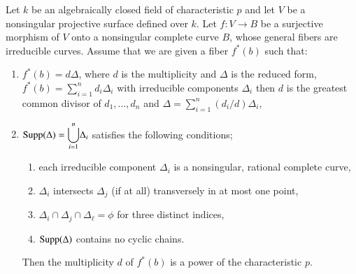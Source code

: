\begin{lemma*}
Let $k$ be an algebraically closed field of characteristic $p$ and let
$V$ be a nonsingular projective surface defined over $k$. Let $f:V\to
B$ be a surjective morphism of $V$ onto a nonsingular complete curve
$B$, whose general fibers are irreducible curves. Assume that we are
given a fiber $f^{\ast}(b)$ such that:
\begin{enumerate}
\renewcommand{\labelenumi}{\rm(\theenumi)}
\item $f^{\ast}(b)=d\Delta$, where $d$ is the multiplicity and
  $\Delta$ is the reduced form, \iec
  $f^{\ast}(b)={\displaystyle{\mathop{\sum}^{n}_{i=1}}}d_{i}\Delta_{i}$
  with irreducible components $\Delta_{i}$ then $d$ is the greatest
  common divisor of $d_{1},\ldots,d_{n}$ and
  $\Delta={\displaystyle{\mathop{\sum}^{n}_{i=1}}}(d_{i}/d)\Delta_{i}$,

\item
  $\operatorname{Supp}(\Delta)={\displaystyle{\mathop{\bigcup}^{n}_{i=1}}}\Delta_{i}$
  satisfies the following conditions;
\begin{enumerate}
\renewcommand{\theenumii}{\roman{enumii}}
\renewcommand{\labelenumii}{\rm(\theenumii)}
\item each irreducible component $\Delta_{i}$ is a nonsingular,
  rational complete curve,

\item $\Delta_{i}$ intersects $\Delta_{j}$ (if at all) transversely
  in at most one point,

\item $\Delta_{i}\cap \Delta_{j}\cap \Delta_{\ell}=\phi$ for three
  distinct indices,

\item $\operatorname{Supp}(\Delta)$ contains no cyclic chains.
\end{enumerate}
Then the multiplicity $d$ of $f^{\ast}(b)$ is a power of the
characteristic $p$.
\end{enumerate}
\end{lemma*}

